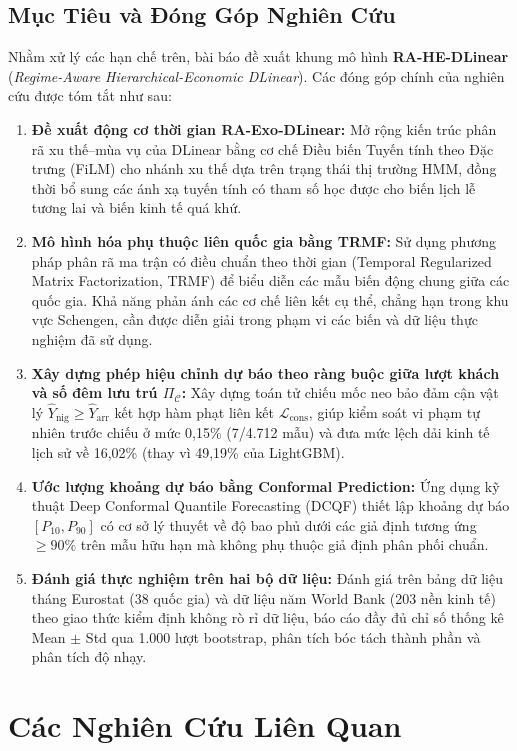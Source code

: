 \documentclass[10pt,journal,compsoc]{IEEEtran}
\begin{document}
\subsection{Mục Tiêu và Đóng Góp Nghiên Cứu}
Nhằm xử lý các hạn chế trên, bài báo đề xuất khung mô hình \textbf{RA-HE-DLinear} (\textit{Regime-Aware Hierarchical-Economic DLinear}). Các đóng góp chính của nghiên cứu được tóm tắt như sau:
\begin{enumerate}
    \item \textbf{Đề xuất động cơ thời gian RA-Exo-DLinear:} Mở rộng kiến trúc phân rã xu thế--mùa vụ của DLinear bằng cơ chế Điều biến Tuyến tính theo Đặc trưng (FiLM) cho nhánh xu thế dựa trên trạng thái thị trường HMM, đồng thời bổ sung các ánh xạ tuyến tính có tham số học được cho biến lịch lễ tương lai và biến kinh tế quá khứ.
    \item \textbf{Mô hình hóa phụ thuộc liên quốc gia bằng TRMF:} Sử dụng phương pháp phân rã ma trận có điều chuẩn theo thời gian (Temporal Regularized Matrix Factorization, TRMF) để biểu diễn các mẫu biến động chung giữa các quốc gia. Khả năng phản ánh các cơ chế liên kết cụ thể, chẳng hạn trong khu vực Schengen, cần được diễn giải trong phạm vi các biến và dữ liệu thực nghiệm đã sử dụng.
    \item \textbf{Xây dựng phép hiệu chỉnh dự báo theo ràng buộc giữa lượt khách và số đêm lưu trú $\Pi_{\mathcal{C}}$:} Xây dựng toán tử chiếu mốc neo bảo đảm cận vật lý $\hat{Y}_{\text{nig}} \ge \hat{Y}_{\text{arr}}$ kết hợp hàm phạt liên kết $\mathcal{L}_{\text{cons}}$, giúp kiểm soát vi phạm tự nhiên trước chiếu ở mức 0,15\% (7/4.712 mẫu) và đưa mức lệch dải kinh tế lịch sử về 16,02\% (thay vì 49,19\% của LightGBM).
    \item \textbf{Ước lượng khoảng dự báo bằng Conformal Prediction:} Ứng dụng kỹ thuật Deep Conformal Quantile Forecasting (DCQF) thiết lập khoảng dự báo $[P_{10}, P_{90}]$ có cơ sở lý thuyết về độ bao phủ dưới các giả định tương ứng $\ge 90\%$ trên mẫu hữu hạn mà không phụ thuộc giả định phân phối chuẩn.
    \item \textbf{Đánh giá thực nghiệm trên hai bộ dữ liệu:} Đánh giá trên bảng dữ liệu tháng Eurostat (38 quốc gia) và dữ liệu năm World Bank (203 nền kinh tế) theo giao thức kiểm định không rò rỉ dữ liệu, báo cáo đầy đủ chỉ số thống kê Mean $\pm$ Std qua 1.000 lượt bootstrap, phân tích bóc tách thành phần và phân tích độ nhạy.
\end{enumerate}
\section{Các Nghiên Cứu Liên Quan}
\end{document}
